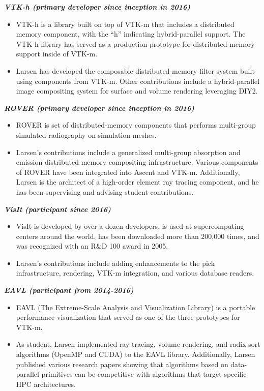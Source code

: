 \documentclass[margin,line]{res}
\begin{document}
\begin{resume}
{\em \textbf{VTK-h (primary developer since inception in  2016)} }
\begin{itemize}
	\item VTK-h is a library built on top of VTK-m that includes a distributed memory component, with the “h” indicating hybrid-parallel support. The VTK-h library has served as a production prototype for distributed-memory support inside of VTK-m.
	\item Larsen has developed the composable distributed-memory filter system built using components from VTK-m. Other contributions include a hybrid-parallel image compositing system for surface and volume rendering leveraging DIY2.
\end{itemize}

{\em \textbf{ROVER (primary developer since inception in 2016)} }
\begin{itemize}
	\item ROVER is set of distributed-memory components that performs multi-group simulated radiography on simulation meshes.
	\item Larsen's contributions include a generalized multi-group absorption and emission distributed-memory compositing infrastructure. Various components of ROVER have been integrated into Ascent and VTK-m. Additionally,
	Larsen is the architect of a high-order element ray tracing component, and he has been supervising and advising student contributions.
\end{itemize}

{\em \textbf{VisIt (participant since 2016)} }
\begin{itemize}
	\item VisIt is developed by over a dozen developers, is used at supercomputing centers around the
	world, has been downloaded more than 200,000 times, and was recognized with an R\&D 100
	award in 2005.
	\item Larsen's contributions include adding enhancements to the pick infrastructure, rendering, VTK-m integration, and various database readers.
\end{itemize}

{\em \textbf{EAVL (participant from 2014-2016)} }
\begin{itemize}
	\item EAVL (The Extreme-Scale Analysis and Visualization Library) is a portable performance visualization that served as one of the three prototypes for VTK-m.
	\item As student, Larsen implemented ray-tracing, volume rendering, and radix sort algorithms (OpenMP and CUDA) to the EAVL library. Additionally, Larsen published various research papers showing that algorithms based on data-parallel primitives can be competitive with algorithms that target specific HPC architectures.
\end{itemize}






\end{resume}
\end{document}
